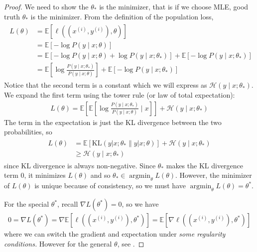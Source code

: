 \documentclass{article}
\begin{document}
\begin{proof}
 We need to show the $\theta_*$ is the minimizer, that is if we choose MLE, good truth $\theta_*$ is the minimizer.
 From the definition of the population loss,
\begin{align*}
\begin{aligned}
L(\theta) &=\mathbb{E}\left[\ell\left((x^{(i)}, y^{(i)}), \theta\right)\right] \\
&=\mathbb{E}[-\log P(y \mid x ; \theta)] \\
&=\mathbb{E}\left[-\log P(y \mid x ; \theta)+\log P\left(y \mid x ; \theta_{*}\right)\right]+\mathbb{E}\left[-\log P\left(y \mid x ; \theta_{*}\right)\right] \\
&=\mathbb{E}\left[\log \frac{P\left(y \mid x ; \theta_{*}\right)}{P(y \mid x ; \theta)}\right]+\mathbb{E}\left[-\log P\left(y \mid x ; \theta_{*}\right)\right]
\end{aligned}
\end{align*}
Notice that the second term is a constant which we will express as $\mathcal{H}\left(y \mid x ; \theta_{*}\right) .$ We expand the first term using the tower rule (or law of total expectation):
\begin{align*}
L(\theta)=\mathbb{E}\left[\mathbb{E}\left[\log \frac{P\left(y \mid x ; \theta_{*}\right)}{P(y \mid x ; \theta)} \mid x\right]\right]+\mathcal{H}\left(y \mid x ; \theta_{*}\right)
\end{align*}
The term in the expectation is just the KL divergence between the two probabilities, so
\begin{align*}
\begin{aligned}
L(\theta) &=\mathbb{E}\left[\mathrm{KL}\left(y\left|x ; \theta_{*} \| y\right| x ; \theta\right)\right]+\mathcal{H}\left(y \mid x ; \theta_{*}\right) \\
& \geq \mathcal{H}\left(y \mid x ; \theta_{*}\right)
\end{aligned}
\end{align*}
since KL divergence is always non-negative. Since $\theta_{*}$ makes the KL divergence term 0, it minimizes $L(\theta)$ and so $\theta_{*} \in \operatorname{argmin}_{\theta} L(\theta) .$ However, the minimizer of $L(\theta)$ is unique because of consistency, so we must have $\operatorname{argmin}_{\theta} L(\theta)=\theta^{*}$.

 For the special $\theta^{*}$, recall $\nabla L\left(\theta^{*}\right)=0$, so we have
\begin{align*}
0=\nabla L\left(\theta^{*}\right)=\nabla \mathbb{E}\left[\ell\left(\left(x^{(i)}, y^{(i)}\right), \theta^{*}\right)\right]=\mathbb{E}\left[\nabla \ell\left(\left(x^{(i)}, y^{(i)}\right), \theta^{*}\right)\right]
\end{align*}
where we can switch the gradient and expectation under \emph{some regularity conditions.}
However for the general  $\theta$, see \cite[page 145]{mitnotes}.


\end{proof}
\end{document}
